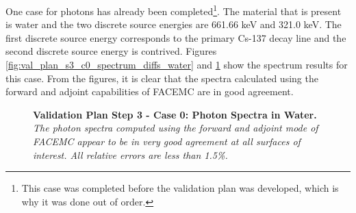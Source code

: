 One case for photons has already been completed\footnote{This case was completed
before the validation plan was developed, which is why it was done out of 
order.}. The material that is present is water and the two discrete source
energies are 661.66 keV and 321.0 keV. The first discrete source energy
corresponds to the primary Cs-137 decay line and the second discrete source 
energy is contrived. Figures \ref{fig:val_plan_s3_c0_spectrum_diffs_water} and
\ref{fig:val_plan_s3_c0_spectrum_water} show the spectrum results for this
case.  From the figures, it is clear that the spectra calculated using the
forward and adjoint capabilities of FACEMC are in good agreement. 
\begin{figure}[t!]
  \begin{center}
  \end{center}
  \caption{\textbf{Validation Plan Step 3 - Case 0: Photon Spectra in Water.}
    \textit{The photon spectra computed using the forward and adjoint
      mode of FACEMC appear to be in very good agreement at all 
      surfaces of interest. All relative errors are less than 1.5\%.}}
  \label{fig:val_plan_s3_c0_spectrum_water}
\end{figure}
